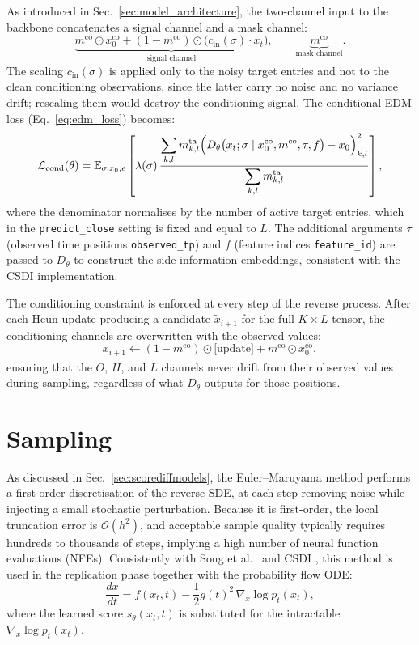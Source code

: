 As introduced in Sec.~\ref{sec:model_architecture}, the two-channel 
input to the backbone concatenates a signal channel and a mask channel:
\[
    \underbrace{m^{\text{co}} \odot x_0^{\text{co}} + 
    (1-m^{\text{co}}) \odot \bigl(c_{\text{in}}(\sigma)\cdot 
    x_t\bigr)}_{\text{signal channel}}, 
    \qquad
    \underbrace{m^{\text{co}}}_{\text{mask channel}}.
\]
The scaling \(c_{\text{in}}(\sigma)\) is applied only to the noisy 
target entries and not to the clean conditioning observations, since the 
latter carry no noise and no variance drift; rescaling them would destroy 
the conditioning signal. The conditional EDM loss (Eq.~\ref{eq:edm_loss}) 
becomes:
\[
    \mathcal{L}_{\text{cond}}(\theta) = \mathbb{E}_{\sigma,x_0,\epsilon}
    \left[\lambda(\sigma)\,
    \frac{\displaystyle\sum_{k,l} m^{\text{ta}}_{k,l}
    \Bigl(D_\theta\bigl(x_t;\sigma \mid x^{\text{co}}_0, m^{\text{co}}, 
    \tau, f\bigr) - x_0\Bigr)^2_{k,l}}
    {\displaystyle\sum_{k,l} m^{\text{ta}}_{k,l}}
    \right],
\]
where the denominator normalises by the number of active target entries, 
which in the \texttt{predict\_close} setting is fixed and equal to \(L\). 
The additional arguments \(\tau\) (observed time positions 
\texttt{observed\_tp}) and \(f\) (feature indices \texttt{feature\_id}) 
are passed to \(D_\theta\) to construct the side information embeddings, 
consistent with the CSDI implementation.

The conditioning constraint is enforced at every step of the reverse 
process. After each Heun update producing a candidate \(\tilde{x}_{i+1}\) 
for the full \(K\times L\) tensor, the conditioning channels are 
overwritten with the observed values:
\[
    x_{i+1} \xleftarrow[]{} (1-m^{\text{co}}) \odot \text{[update]} 
    + m^{\text{co}} \odot x_0^{\text{co}},
\]
ensuring that the \(O\), \(H\), and \(L\) channels never drift from 
their observed values during sampling, regardless of what \(D_\theta\) 
outputs for those positions.

\section{Sampling}

As discussed in Sec.~\ref{sec:scorediffmodels}, the Euler--Maruyama 
method performs a first-order discretisation of the reverse SDE, at each 
step removing noise while injecting a small stochastic perturbation. 
Because it is first-order, the local truncation error is 
\(\mathcal{O}(h^2)\), and acceptable sample quality typically requires 
hundreds to thousands of steps, implying a high number of neural function 
evaluations (NFEs). Consistently with Song et al.\ \cite{song2021score} 
and CSDI \cite{tashiro2021csdi}, this method is used in the replication 
phase together with the probability flow ODE:
\begin{equation}
    \label{eq:prob_flow_ode}
    \frac{dx}{dt} = f(x_t, t) - \frac{1}{2}g(t)^2\,\nabla_x 
    \log p_t(x_t),
\end{equation}
where the learned score \(s_\theta(x_t,t)\) is substituted for the 
intractable \(\nabla_x \log p_t(x_t)\).

